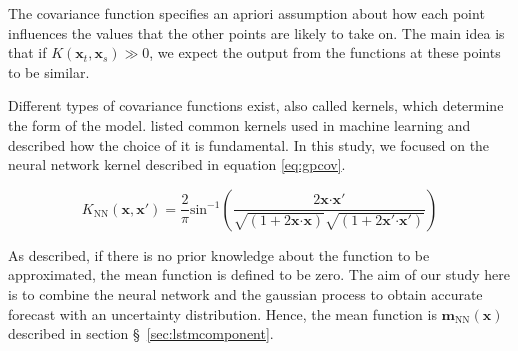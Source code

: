 The covariance function specifies an apriori assumption about how each point influences the values that the 
other points are likely to take on. The main idea is that if $K(\mathbf{x}_t, \mathbf{x}_s) \gg 0$, 
we expect the output from the functions at these points to be similar. 

Different types of covariance functions exist, also called kernels, which determine the form of the model. 
\citet{ChandorkarDst} listed common kernels used in machine learning and described how the choice of 
it is fundamental. In this study, we focused on the neural network kernel \citep{williams1998computation} 
described in equation \ref{eq:gpcov}. 


\begin{equation}\label{eq:gpcov}
 K_{\text{NN}} \left( \mathbf{x}, \mathbf{x}' \right) = 
 \frac{2}{ \pi } \text{sin}^{-1} \left( \frac{2\mathbf{x}\boldsymbol{\cdot}\mathbf{x}'}{
	 \sqrt{ \left( 1+2\mathbf{x}\boldsymbol{\cdot} \mathbf{x} \right) }\sqrt{ \left( 1+2\mathbf{x}'\boldsymbol{\cdot}\mathbf{x}' \right)}
	 } \right)
\end{equation}


As \citet{Rasmussen:2005:GPM:1162254} described, if there is no prior knowledge about 
the function to be approximated, the mean function is defined to be zero. The aim of our study here is to 
combine the neural network and the gaussian process to obtain accurate forecast with an uncertainty distribution. 
Hence, the mean function is \( \mathbf{m}_{\text{NN}} \left( \mathbf{x} \right)  \) described in section \S~\ref{sec:lstmcomponent}.






